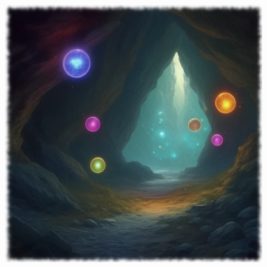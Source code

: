 \begin{figure}[h]
\begin{center}
\includegraphics[scale=0.24]{img/ai-images/magic-spirit.png}
\end{center}
\end{figure}
